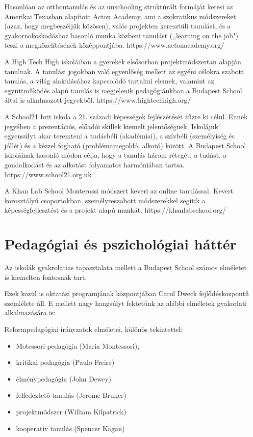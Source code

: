 Hasonlóan az otthontanulás és az  unschooling struktúrált formáját keresi az Amerikai Texasban alapított Acton Academy, ami a szokratikus módszereket (azaz, hogy megbeszéljük közösen), valós projekten keresztüli tanulást, és a gyakornokoskodáshoz hasonló munka közbeni tanulást (,,learning on the job") teszi a megközelítésének középpontjába.
https://www.actonacademy.org/



A High Tech High iskoláiban a gyerekek elsősorban projektmódszertan
alapján tanulnak. A tanulási jogokban való egyenlőség mellett az egyéni
célokra szabott tanulás, a világ alakulásához kapcsolódó tartalmi
elemek, valamint az együttműködés alapú tanulás is megjelenik
pedagógiáukban a Budapest School által is alkalmazott jegyekből.
https://www.hightechhigh.org/

A School21 brit iskola a 21. századi képességek fejlészétését tűzte ki
célul. Ennek jegyében a prezentációs, előadói skillek kiemelt
jelentőségüek. Iskolájuk egyensúlyt akar teremteni a tudásbéli
(akadémiai), a szívbéli (személyiség és jóllét) és a kézzel fogható
(problémamegoldó, alkotó) között. A Budapest School iskoláinak hasonló
módon célja, hogy a tanulás három rétegét, a tudást, a gondolkodást és
az alkotást folyamatos harmóniában tartsa. https://www.school21.org.uk

A Khan Lab School Monterossi módszert keveri az online tanulással. Kevert korosztályú csoportokban, személyreszabott módszerekkel segítik a képességfejlesztést és a projekt alapú munkát.
https://khanlabschool.org/

\section{Pedagógiai és pszichológiai háttér}

Az iskolák gyakrolatias tapasztalata mellett a Budapest School számos
elméletet is kiemelten fontosnak tart.

Ezek közül is oktatási programjának központjában Carol Dweck
fejlődésközpontű szemlélete áll. E mellett nagy hangsúlyt fektetünk az
alábbi elméletek gyakorlati alkalmazására is:

Reformpedagógiai irányzatok elméletei, különös tekintettel:

\begin{itemize}

\item
  Motessori-pedagógia (Maria Montessori),
\item
  kritikai pedagógia (Paulo Freire)
\item
  élménypedagógia (John Dewey)
\item
  felfedeztető tanulás (Jerome Bruner)
\item
  projektmódszer (William Kilpatrick)
\item
  kooperatív tanulás (Spencer Kagan)
\end{itemize}

